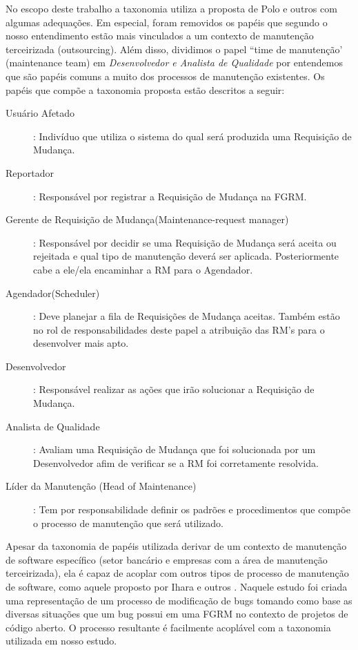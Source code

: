 No escopo deste trabalho a taxonomia utiliza a proposta de Polo e outros com algumas adequações. Em
especial, foram removidos os papéis que segundo o nosso entendimento estão mais vinculados a um
contexto de manutenção terceirizada (outsourcing). Além disso, dividimos o papel ``time de manutenção'
(maintenance team) em \textit{Desenvolvedor e Analista de Qualidade} por entendemos que são papéis
comuns a muito dos processos de manutenção existentes. Os papéis que compõe a taxonomia proposta
estão descritos a seguir:

\begin{description}
	\item[Usuário Afetado]: Indivíduo que utiliza o sistema do qual será produzida uma Requisição de
		Mudança.
	\item[Reportador]: Responsável por registrar a Requisição de Mudança na FGRM.
	\item[Gerente de Requisição de Mudança(Maintenance-request manager)]: Responsável por decidir se
		uma Requisição de Mudança será aceita ou rejeitada e qual tipo de manutenção deverá ser
		aplicada. Posteriormente cabe a ele/ela encaminhar a RM para o Agendador.
	\item[Agendador(Scheduler)]: Deve planejar a fila de Requisições de Mudança aceitas. Também
		estão no rol de responsabilidades deste papel a atribuição das RM's para o desenvolver
		mais apto.
	\item[Desenvolvedor]: Responsável realizar as ações que irão solucionar a Requisição de Mudança.
	\item[Analista de Qualidade]: Avaliam uma Requisição de Mudança que foi solucionada por um
		Desenvolvedor afim de verificar se a RM foi corretamente resolvida.
	\item[Líder da Manutenção (Head of Maintenance)]: Tem por responsabilidade definir os padrões
		e procedimentos que compõe o processo de manutenção que será utilizado.
\end{description}

Apesar da taxonomia de papéis utilizada derivar de um contexto de manutenção de software específico
(setor bancário e empresas com a área de manutenção terceirizada), ela é capaz de acoplar com outros
tipos de processo de manutenção de software, como aquele proposto por Ihara e outros
\cite{Ihara:2009:AMI:1595808.1595833}. Naquele estudo foi criada uma representação de um processo
de modificação de bugs tomando como base as diversas situações que um bug possui em uma FGRM no contexto de projetos de código aberto. O processo resultante é facilmente acoplável com a taxonomia utilizada em
nosso estudo.

